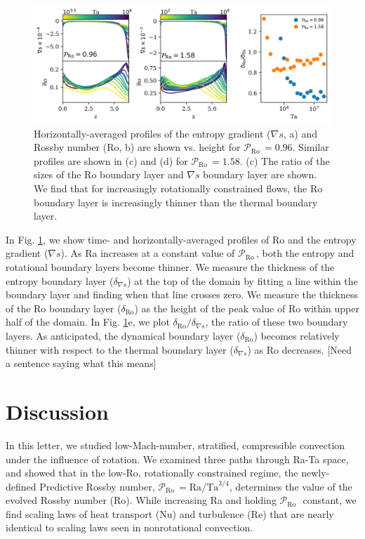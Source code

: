 \documentclass[twocolumn, amsmath, amsfonts, amssymb]{aastex62}
\newcommand{\grad}{\ensuremath{\nabla}}
\newcommand{\pro}{\ensuremath{\mathcal{P}_{\text{Ro}}\,}}
\begin{document}
\begin{figure}[h]
\includegraphics[width=\textwidth]{./figs/boundary_layers.png}
\caption{Horizontally-averaged profiles of the entropy gradient ($\grad s$, a)
and Rossby number (Ro, b) are shown vs. height for $\pro = 0.96$. 
Similar profiles are shown in (c) and (d) for $\pro = 1.58$. 
(c) The ratio of the sizes of the Ro boundary layer and $\grad s$ boundary layer are
shown. We find that for increasingly rotationally constrained flows, the Ro boundary layer
is increasingly thinner than the thermal boundary layer.
\label{fig:profiles_and_bls} }
\end{figure}

In Fig. \ref{fig:profiles_and_bls}, we show time- and horizontally-averaged profiles of
Ro and the entropy gradient ($\grad s$). As Ra increases at a constant value of
\pro, both the entropy and rotational boundary layers become thinner. We measure the
thickness of the entropy boundary layer ($\delta_{\grad s}$) at the top of the domain by 
fitting a line within the boundary layer and finding when that line crosses zero. We measure
the thickness of the Ro boundary layer ($\delta_{\text{Ro}}$) 
as the height of the peak value of Ro within 
upper half of the domain.
In Fig. \ref{fig:profiles_and_bls}e, we plot $\delta_{\text{Ro}}/\delta_{\grad s}$, the ratio
of these two boundary layers. As anticipated, the dynamical boundary layer ($\delta_{\text{Ro}}$)
becomes relatively thinner with respect to the thermal boundary layer ($\delta_{\grad s}$)
as Ro decreases. [Need a sentence saying what this means]

\section{Discussion}
\label{sec:discussion}
In this letter, we studied low-Mach-number, stratified, compressible convection 
under the influence of rotation.
We examined three paths through Ra-Ta space, and showed that in the low-Ro, rotationally
constrained regime, the newly-defined 
Predictive Rossby number, $\pro = \text{Ra}/\text{Ta}^{3/4}$, determines the value of
the evolved Rossby number (Ro). While increasing Ra and holding \pro$\,$ constant,
we find scaling laws of heat transport (Nu) and turbulence (Re) that are nearly identical
to scaling laws seen in nonrotational convection.
\end{document}
